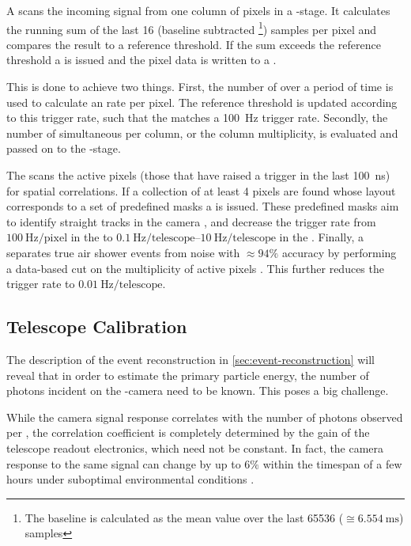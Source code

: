 A \FPGA scans the incoming signal from one column of pixels in a \FLT-stage. It
calculates the running sum of the last 16 (baseline subtracted \footnote{The
baseline is calculated as the mean \ADC value over the last 65536 
($\cong\SI{6.554}{\milli\second}$) samples}) \ADC samples per pixel and 
compares the result to a reference threshold. If the sum exceeds the reference 
threshold a \FLT is issued and the pixel data is written to a \SRAM. 

This is done to achieve two things. First, the number of \FLTs over a period of
time is used to calculate an \FLT rate per pixel. The reference threshold is 
updated according to this trigger rate, such that the \FLT matches a 
\SI{100}{\hertz} trigger rate. Secondly, the number of simultaneous \FLTs per 
column, or the column multiplicity, is evaluated and passed on to the 
\SLT-stage.

The \SLT scans the active pixels (those that have raised a trigger in the last 
\SI{100}{\nano\second}) for spatial correlations. If a collection of at least 4
pixels are found whose layout corresponds to a set of predefined masks a \SLT 
is issued. These predefined masks aim to identify straight tracks in the camera
\FOV, and decrease the trigger rate from $\SI{100}{\hertz\per\mathrm{pixel}}$ 
in the \FLT to 
$\SIrange[range-units = single]{0.1}{10}{\hertz\per\mathrm{telescope}}$ in the 
\SLT. Finally, a \TLT separates true air shower events from noise with 
$\approx94\%$ accuracy by performing a data-based cut on the multiplicity of 
active pixels \cite{abrahamFluorescenceDetectorPierre2010}. This further 
reduces the trigger rate to $\SI{0.01}{\hertz\per\mathrm{telescope}}$. 

\subsection{Telescope Calibration}
\label{ssec:fd-calibration}

The description of the event reconstruction in \cref{sec:event-reconstruction}
will reveal that in order to estimate the primary particle energy, the number 
of photons incident on the \FD-camera need to be known. This poses a big 
challenge. 

While the camera signal response correlates with the number of photons observed
per \EAS, the correlation coefficient is completely determined by the gain of 
the telescope readout electronics, which need not be constant. In fact, the 
camera response to the same signal can change by up to $6\%$ within the 
timespan of a few hours under suboptimal environmental conditions 
\cite{filipJumpsXYCalibration2024}.

